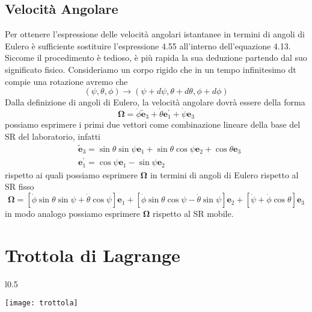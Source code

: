 \subsection{Velocit\`{a} Angolare}
Per ottenere l'espressione delle velocit\`{a} angolari istantanee in termini di angoli di Eulero \`{e} sufficiente sostituire l'espressione 4.55 all'interno dell'equazione 4.13. Siccome il procedimento \`{e} tedioso, \`{e} pi\`{u} rapida la sua deduzione partendo dal suo significato fisico. Consideriamo un corpo rigido che in un tempo infinitesimo dt compie una rotazione avremo che 
\begin{equation}
(\psi, \theta, \phi) \rightarrow(\psi+d \psi, \theta+d \theta, \phi+d \phi)
\end{equation}
Dalla definizione di angoli di Eulero, la velocit\`{a} angolare dovr\`{a} essere della forma 
\begin{equation}
\boldsymbol{\Omega}=\dot{\phi} \tilde{\mathbf{e}}_3+\dot{\theta} \mathbf{e}_1^{\prime}+\dot{\psi} \mathbf{e}_3
\end{equation}
possiamo esprimere i primi due vettori come combinazione lineare della base del SR del laboratorio, infatti
\begin{equation}
\begin{aligned}
& \tilde{\mathbf{e}}_3=\sin \theta \sin \psi \mathbf{e}_1+\sin \theta \cos \psi \mathbf{e}_2+\cos \theta \mathbf{e}_3 \\
& \mathbf{e}_1^{\prime}=\cos \psi \mathbf{e}_1-\sin \psi \mathbf{e}_2
\end{aligned}
\end{equation}
rispetto ai quali possiamo esprimere $\bm{\Omega}$ in termini di angoli di Eulero rispetto al SR fisso
\begin{equation*}
\boldsymbol{\Omega}=[\dot{\phi} \sin \theta \sin \psi+\dot{\theta} \cos \psi] \mathbf{e}_1+[\dot{\phi} \sin \theta \cos \psi-\dot{\theta} \sin \psi] \mathbf{e}_2+[\dot{\psi}+\dot{\phi} \cos \theta] \mathbf{e}_3
\end{equation*}
in modo analogo possiamo esprimere $\bm{\Omega}$ rispetto al SR mobile.
\section{Trottola di Lagrange}

\begin{wrapfigure}[7]{l}{0.5\textwidth}
\vspace{-1.4cm}
  \begin{center}
    \texttt{[image: trottola]}
    \end{center}
\end{wrapfigure}

